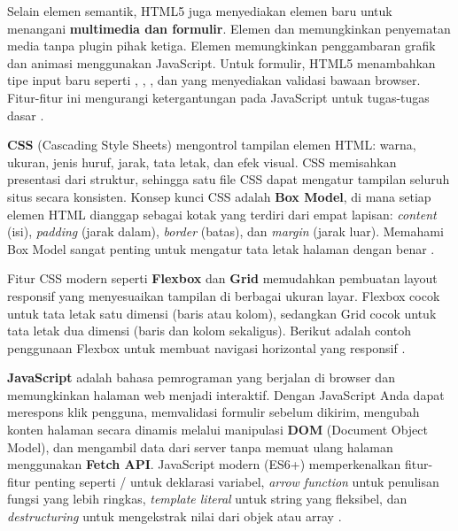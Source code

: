 Selain elemen semantik, HTML5 juga menyediakan elemen baru untuk menangani \textbf{multimedia dan formulir}. Elemen  dan  memungkinkan penyematan media tanpa plugin pihak ketiga. Elemen  memungkinkan penggambaran grafik dan animasi menggunakan JavaScript. Untuk formulir, HTML5 menambahkan tipe input baru seperti , , , dan  yang menyediakan validasi bawaan browser. Fitur-fitur ini mengurangi ketergantungan pada JavaScript untuk tugas-tugas dasar \cite{webdevHtml}.

\textbf{CSS} (Cascading Style Sheets) mengontrol tampilan elemen HTML: warna, ukuran, jenis huruf, jarak, tata letak, dan efek visual. CSS memisahkan presentasi dari struktur, sehingga satu file CSS dapat mengatur tampilan seluruh situs secara konsisten. Konsep kunci CSS adalah \textbf{Box Model}, di mana setiap elemen HTML dianggap sebagai kotak yang terdiri dari empat lapisan: \textit{content} (isi), \textit{padding} (jarak dalam), \textit{border} (batas), dan \textit{margin} (jarak luar). Memahami Box Model sangat penting untuk mengatur tata letak halaman dengan benar \cite{mdnCss}.

Fitur CSS modern seperti \textbf{Flexbox} dan \textbf{Grid} memudahkan pembuatan layout responsif yang menyesuaikan tampilan di berbagai ukuran layar. Flexbox cocok untuk tata letak satu dimensi (baris atau kolom), sedangkan Grid cocok untuk tata letak dua dimensi (baris dan kolom sekaligus). Berikut adalah contoh penggunaan Flexbox untuk membuat navigasi horizontal yang responsif \cite{webdevCss}.


\vspace{0.5cm}
\textbf{JavaScript} adalah bahasa pemrograman yang berjalan di browser dan memungkinkan halaman web menjadi interaktif. Dengan JavaScript Anda dapat merespons klik pengguna, memvalidasi formulir sebelum dikirim, mengubah konten halaman secara dinamis melalui manipulasi \textbf{DOM} (Document Object Model), dan mengambil data dari server tanpa memuat ulang halaman menggunakan \textbf{Fetch API}. JavaScript modern (ES6+) memperkenalkan fitur-fitur penting seperti / untuk deklarasi variabel, \textit{arrow function} untuk penulisan fungsi yang lebih ringkas, \textit{template literal} untuk string yang fleksibel, dan \textit{destructuring} untuk mengekstrak nilai dari objek atau array \cite{mdnJsGuide}.

